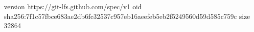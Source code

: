 version https://git-lfs.github.com/spec/v1
oid sha256:7f1c57fbce683ae2db6fc32537c957eb16aeefeb5eb2f5249560d59d585c759c
size 32864
